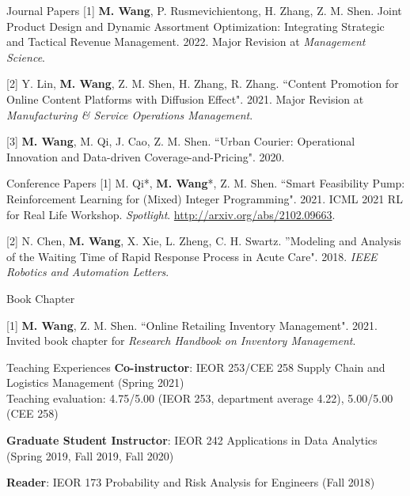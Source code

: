 \documentclass{resume} %
\makeatletter
\def\blfootnote{\xdef\@thefnmark{}\@footnotetext}
\makeatother
\begin{document}

\begin{rSection}{Journal Papers} 
[1] \textbf{M. Wang}, P. Rusmevichientong, H. Zhang, Z. M. Shen. Joint Product Design and Dynamic Assortment Optimization: Integrating Strategic and Tactical Revenue Management. 2022. Major Revision at \textit{Management Science}.

[2] Y. Lin, \textbf{M. Wang}, Z. M. Shen, H. Zhang, R. Zhang. ``Content Promotion for Online Content Platforms with Diffusion Effect". 2021. Major Revision at \textit{Manufacturing \& Service Operations Management}.

[3] \textbf{M. Wang}, M. Qi, J. Cao, Z. M. Shen. ``Urban Courier: Operational Innovation and Data-driven Coverage-and-Pricing". 2020.
\end{rSection}

\begin{rSection}{Conference Papers} 
[1] M. Qi*\blfootnote{* denotes alphabetical ordering.}, \textbf{M. Wang}*, Z. M. Shen. ``Smart Feasibility Pump: Reinforcement Learning for (Mixed) Integer Programming". 2021. ICML 2021 RL for Real Life Workshop. \textit{Spotlight}. \url{http://arxiv.org/abs/2102.09663}.

[2] N. Chen, \textbf{M. Wang}, X. Xie, L. Zheng, C. H. Swartz. ''Modeling and Analysis of the Waiting Time of Rapid Response Process in Acute Care". 2018. \textit{IEEE Robotics and Automation Letters}.
\end{rSection}

\newpage
\begin{rSection}{Book Chapter}

[1] \textbf{M. Wang}, Z. M. Shen. ``Online Retailing Inventory Management". 2021. Invited book chapter for \textit{Research Handbook on Inventory Management}. 

\end{rSection}

\begin{rSection}{Teaching Experiences}
\vspace{1mm}\textbf{Co-instructor}: IEOR 253/CEE 258 Supply Chain and Logistics Management (Spring 2021) \\Teaching evaluation: 4.75/5.00 (IEOR 253, department average 4.22), 5.00/5.00 (CEE 258)

\vspace{1mm}\textbf{Graduate Student Instructor}:
IEOR 242 Applications in Data Analytics (Spring 2019, Fall 2019, Fall 2020)

\vspace{1mm}\textbf{Reader}: IEOR 173 Probability and Risk Analysis for Engineers (Fall 2018)




\end{rSection}
\end{document}

